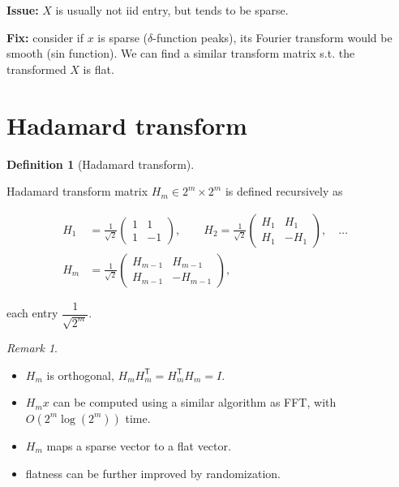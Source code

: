 \documentclass[
  letterpaper,
  DIV=11,
  numbers=noendperiod]{scrreprt}
\providecommand{\tightlist}{%
  \setlength{\itemsep}{0pt}\setlength{\parskip}{0pt}}
\theoremstyle{definition}
\newtheorem{definition}{Definition}[chapter]
\theoremstyle{plain}
\theoremstyle{plain}
\theoremstyle{definition}
\theoremstyle{plain}
\theoremstyle{plain}
\theoremstyle{remark}
\newtheorem*{remark}{Remark}
\begin{document}
\textbf{Issue:} \(X\) is usually not iid entry, but tends to be sparse.

\textbf{Fix:} consider if \(x\) is sparse (\(\delta\)-function peaks),
its Fourier transform would be smooth (sin function). We can find a
similar transform matrix s.t. the transformed \(X\) is flat.

\section{Hadamard transform}\label{hadamard-transform}

\begin{definition}[Hadamard
transform]\protect\hypertarget{def-hadamard}{}\label{def-hadamard}

Hadamard transform matrix \(H_m \in 2^m \times 2^m\) is defined
recursively as

\[
\begin{align}
H_1 &= \frac{1}{\sqrt{2}}\begin{pmatrix} 1 & 1 \\ 1 & -1 \end{pmatrix}, \qquad
H_2 = \frac{1}{\sqrt{2}}\begin{pmatrix} H_1 & H_1 \\ H_1 & -H_1 \end{pmatrix},
\quad \dots \quad\\
H_m &= \frac{1}{\sqrt{2}}\begin{pmatrix} H_{m-1} & H_{m-1} \\ H_{m-1} & -H_{m-1} \end{pmatrix},
\end{align}
\]

each entry \(\dfrac{1}{\sqrt{2^m}}\).

\end{definition}

\begin{remark}
\leavevmode

\begin{itemize}
\tightlist
\item
  \(H_m\) is orthogonal,
  \(H_m H_m^{\mathsf{T}} = H_m^{\mathsf{T}} H_m = I\).
\item
  \(H_m x\) can be computed using a similar algorithm as FFT, with
  \(O(2^m \log(2^m))\) time.
\item
  \(H_m\) maps a sparse vector to a flat vector.
\item
  flatness can be further improved by randomization.
\end{itemize}

\end{remark}
\end{document}

